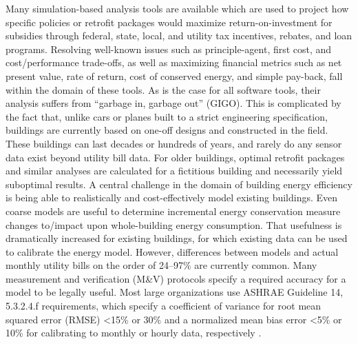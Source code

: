 \documentclass[preprint, review, 12pt]{elsarticle}
\begin{document}
Many simulation-based analysis tools are available which are used to project how specific policies or retrofit packages would maximize return-on-investment for subsidies through federal, state, local, and utility tax incentives, rebates, and loan programs. Resolving well-known issues such as principle-agent, first cost, and cost/performance trade-offs, as well as maximizing financial metrics such as net present value, rate of return, cost of conserved energy, and simple pay-back, fall within the domain of these tools. As is the case for all software tools, their analysis suffers from ``garbage in, garbage out'' (GIGO). This is complicated by the fact that, unlike cars or planes built to a strict engineering specification, buildings are currently based on one-off designs and constructed in the field. These buildings can last decades or hundreds of years, and rarely do any sensor data exist beyond utility bill data. For older buildings, optimal retrofit packages and similar analyses are calculated for a fictitious building and necessarily yield suboptimal results. A central challenge in the domain of building energy efficiency is being able to realistically and cost-effectively model existing buildings. Even coarse models are useful to determine incremental energy conservation measure changes to/impact upon whole-building energy consumption. That usefulness is dramatically increased for existing buildings, for which existing data can be used to calibrate the energy model. However, differences between models and actual monthly utility bills on the order of 24--97\% \cite{cit:earthadvantage2009,cit:roberts2012} are currently common. Many measurement and verification (M\&V) protocols specify a required accuracy for a model to be legally useful. Most large organizations use ASHRAE Guideline 14, 5.3.2.4.f requirements, which specify a coefficient of variance for root mean squared error (RMSE) \textless 15\% or 30\% and a normalized mean bias error \textless 5\% or 10\% for calibrating to monthly or hourly data, respectively \cite{cit:ashrae2002}.
\end{document}
